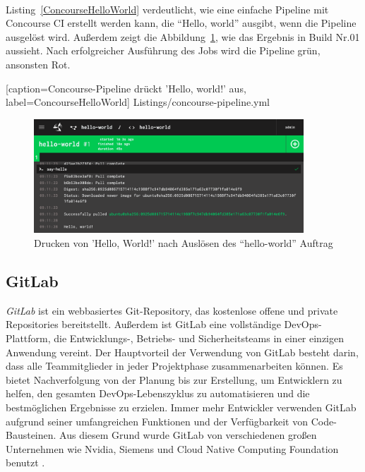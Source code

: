 \ \\
Listing~\ref{ConcourseHelloWorld} verdeutlicht, wie eine einfache Pipeline mit Concourse CI erstellt werden kann, die “Hello, world” ausgibt, wenn die Pipeline ausgelöst wird. Außerdem zeigt die Abbildung~\ref{fig:ConcourseHelloWorld}, wie das Ergebnis in Build Nr.01 aussieht. Nach erfolgreicher Ausführung des Jobs wird die Pipeline grün, ansonsten Rot.


[caption={Concourse-Pipeline drückt 'Hello, world!' aus}, label=ConcourseHelloWorld]
{Listings/concourse-pipeline.yml}

\begin{figure}[!htbp]%
	\centering
	\includegraphics[width=0.9\textwidth]{Graphics/concourse-ci-job-success.png}
	\caption{Drucken von 'Hello, World!' nach Auslösen des “hello-world” Auftrag}
	\label{fig:ConcourseHelloWorld}
\end{figure}

\subsection{GitLab}

\textit{GitLab} ist ein webbasiertes Git-Repository, das kostenlose offene und private Repositories bereitstellt. 
Außerdem ist GitLab eine vollständige DevOps-Plattform, die Entwicklungs-, Betriebs- und Sicherheitsteams in einer einzigen Anwendung vereint. Der Hauptvorteil der Verwendung von GitLab besteht darin, dass alle Teammitglieder in jeder Projektphase zusammenarbeiten können. Es bietet Nachverfolgung von der Planung bis zur Erstellung, um Entwicklern zu helfen, den gesamten DevOps-Lebenszyklus zu automatisieren und die bestmöglichen Ergebnisse zu erzielen. Immer mehr Entwickler verwenden GitLab aufgrund seiner umfangreichen Funktionen und der Verfügbarkeit von Code-Bausteinen. Aus diesem Grund wurde GitLab von verschiedenen großen Unternehmen wie Nvidia, Siemens und Cloud Native Computing Foundation benutzt \cite{GitLab:about}. 

